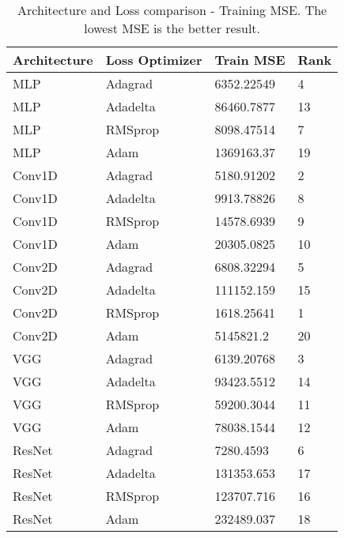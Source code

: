\begin{table*}[!ht]
    \footnotesize
    \centering
    \begin{tabular}{@{}llll@{}}\toprule
            Architecture & Loss Optimizer & Train MSE & Rank         \\ \hline
            MLP          & Adagrad        & 6352.22549   & 4    \\
            MLP          & Adadelta       & 86460.7877   & 13   \\
            MLP          & RMSprop        & 8098.47514   & 7    \\
            MLP          & Adam           & 1369163.37   & 19   \\
            Conv1D       & Adagrad        & 5180.91202   & 2    \\
            Conv1D       & Adadelta       & 9913.78826   & 8    \\
            Conv1D       & RMSprop        & 14578.6939   & 9    \\
            Conv1D       & Adam           & 20305.0825   & 10   \\
            Conv2D       & Adagrad        & 6808.32294   & 5    \\
            Conv2D       & Adadelta       & 111152.159   & 15   \\
            Conv2D       & RMSprop        & 1618.25641   & 1    \\
            Conv2D       & Adam           & 5145821.2    & 20   \\
            VGG          & Adagrad        & 6139.20768   & 3    \\
            VGG          & Adadelta       & 93423.5512   & 14   \\
            VGG          & RMSprop        & 59200.3044   & 11   \\
            VGG          & Adam           & 78038.1544   & 12   \\
            ResNet       & Adagrad        & 7280.4593    & 6    \\
            ResNet       & Adadelta       & 131353.653   & 17   \\
            ResNet       & RMSprop        & 123707.716   & 16   \\
            ResNet       & Adam           & 232489.037   & 18   \\ \hline
    \end{tabular}
    \caption[Architecture and Loss comparison - Training MSE.]{Architecture and Loss comparison - Training MSE. The lowest MSE is the better result.}\label{tab:app_res1_train_MSE}
\end{table*}

